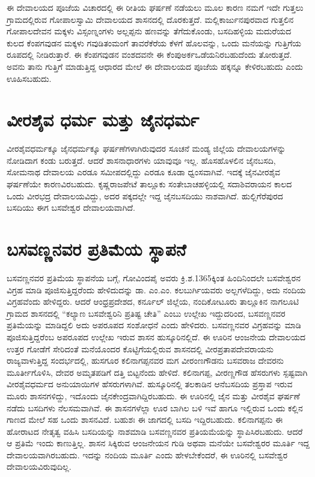 ಈ ದೇವಾಲಯದ ಪೂಜೆಯ ವಿಚಾರದಲ್ಲಿ ಈ ರೀತಿಯ ಘರ್ಷಣೆ ನಡೆಯಲು ಮೂಲ ಕಾರಣ ನಮಗೆ ಇದೇ ಗುತ್ತಲು ಗ್ರಾಮದಲ್ಲಿರುವ ಗೋಪಾಲಸ್ವಾಮಿ ದೇವಾಲಯದ ಶಾಸನದಲ್ಲಿ ದೊರಕುತ್ತದೆ. ಮಲ್ಲಿಕಾರ್ಜುನಪುರವಾದ ಗುತ್ತಲಿನ ಗೋಪಾಲದೇವನ ಮಕ್ಕಳು ವಿಸ್ಸಂಣ್ನಂಗಳು ಅಲ್ಲಪ್ಪನು ಹಣವನ್ನು ತೆಗೆದುಕೊಂಡು, ಬಸದಿಹಳ್ಳಿಯ ಮದುರೆಯದ ಕುಲದ ಕೆಂಪಗವುಡನ ಮಕ್ಕಳು ಗವುಡಿತಂಮಂಗೆ ತಾವರೆಕೆರೆಯ ಕೆಳಗೆ ಹೊಲವನ್ನು, ಒಂದು ಮನೆಯನ್ನು ಗುತ್ತಿಗೆಯ ರೂಪದಲ್ಲಿ ನೀಡಿರುತ್ತಾರೆ. ಈ ಕೆಂಪಗವುಡನ ವಂಶದವನೇ ಈ ಕೆಂಪುಅರ್ಕಒಡೆಯನಿರಬಹುದೆಂದು ತೋರುತ್ತದೆ. ಅವನು ತಾನು ಗುತ್ತಿಗೆ ಮಾಡುತ್ತಿದ್ದ ಆಧಾರದ ಮೇಲೆ ಈ ದೇವಾಲಯದ ಪೂಜೆಯ ಹಕ್ಕನ್ನೂ ಕೇಳಿರಬಹುದು ಎಂದು ಊಹಿಸಬಹುದು.


\section{ವೀರಶೈವ ಧರ್ಮ ಮತ್ತು ಜೈನಧರ್ಮ}

ವೀರಶೈವಧರ್ಮಕ್ಕೂ ಜೈನಧರ್ಮಕ್ಕೂ ಘರ್ಷಣೆಗಳಾಗಿರುವುದರ ಸೂಚನೆ ಮಂಡ್ಯ ಜಿಲ್ಲೆಯ ದೇವಾಲಯಗಳನ್ನು ನೋಡಿದಾಗ ಕಂಡು ಬರುತ್ತದೆ. ಆದರೆ ಶಾಸನಾಧಾರಗಳು ಯಾವುವೂ ಇಲ್ಲ. ಹೊಸಹೊಳಲಿನ ಜೈನಬಸದಿ, ಸೋಮನಾಥ ದೇವಾಲಯ ಎರಡೂ ಸಮೀಪದಲ್ಲಿದ್ದು ಎರಡೂ ಕೂಡಾ ಧ್ವಂಸವಾಗಿವೆ. ಇದಕ್ಕೆ ಜೈನವೀರಶೈವ ಘರ್ಷಣೆಯೇ ಕಾರಣವಿರಬಹುದು. ಕೃಷ್ಣರಾಜಪೇಟೆ ತಾಲ್ಲೂಕು ಸಂತೇಬಾಚಹಳ್ಳಿಯಲ್ಲಿ ಸದಾಶಿವರಾಯನ ಕಾಲದ ಒಂದು ವೀರಭದ್ರ ದೇವಾಲಯವಿದ್ದು, ಅದರ ಪಕ್ಕದಲ್ಲೇ ಇದ್ದ ಜೈನಬಸದಿಯು ನಾಶವಾಗಿದೆ. ಹುಲ್ಲಿಗೆರೆಪುರದ ಬಸದಿಯು ಈಗ ಬಸವೇಶ್ವರ ದೇವಾಲಯವಾಗಿದೆ.


\section{ಬಸವಣ್ಣನವರ ಪ್ರತಿಮೆಯ ಸ್ಥಾಪನೆ}

ಬಸವಣ್ಣನವರ ಪ್ರತಿಮೆಯ ಸ್ಥಾಪನೆಯ ಬಗ್ಗೆ, ಗೋವಿಂದಪೈ ಅವರು ಕ್ರಿ.ಶ.1365ಕ್ಕಿಂತ ಹಿಂದಿನಿಂದಲೇ ಬಸವೇಶ್ವರನ ವಿಗ್ರಹ ಮಾಡಿ ಪೂಜಿಸುತ್ತಿದ್ದರೆಂದು ಹೇಳಿದುದನ್ನು ಡಾ. ಎಂ.ಎಂ. ಕಲಬುರ್ಗಿಯವರು ಅಲ್ಲಗಳೆದಿದ್ದು, ಅದು ನಂದಿಯ ವಿಗ್ರಹವೆಂದು ಹೇಳಿದ್ದರು. ಆದರೆ ಆಂಧ್ರಪ್ರದೇಶದ, ಕರ್ನೂಲ್​ ಜಿಲ್ಲೆಯ, ನಂದಿಕೋಟೂರು ತಾಲ್ಲೂಕಿನ ನಾಗಲೂಟಿ ಗ್ರಾಮದ ಶಾಸನದಲ್ಲಿ “ಕಲ್ಯಾಣ ಬಸವೇಶ್ವರಿನಿ ಪ್ರತಿಷ್ಟ ಚೇತಿ” ಎಂಬು ಉಲ್ಲೇಖ ಇದ್ದುದರಿಂದ, ಬಸವಣ್ಣನವರ ಪ್ರತಿಮೆಯನ್ನು ಮಾಡಿದ್ದಲಿ ಅದು ಅಪರೂಪದ ಸಂಶೋಧನೆ ಎಂದು ಹೇಳಿದರು. ಬಸವಣ್ಣನವರ ವಿಗ್ರಹವನ್ನು ಮಾಡಿ ಪೂಜಿಸುತ್ತಿದ್ದರೆಂಬ ಅಪರೂಪದ ಉಲ್ಲೇಖ ಇರುವ ಶಾಸನ ಹುಸ್ಕೂರಿನಲ್ಲಿದೆ. ಈ ಊರಿನ ಆಂಜನೇಯ ದೇವಾಲಯದ ಉತ್ತರ ಗೋಡೆಗೆ ಸೇರಿದಂತೆ ಮನೆಯೊಂದರ ಕೊಟ್ಟಿಗೆಯಲ್ಲಿರುವ ಶಾಸನದಲ್ಲಿ ವೀರಪ್ರತಾಪದೇವರಾಯನು ರಾಜ್ಯವಾಳುತ್ತಿದ್ದ ಸಂದರ್ಭದಲ್ಲಿ, ಹುಸಗೂರ ಕಲಿನಾಗಪ್ಪನವರ ಮಗ ವೀರಂಣಗೌಡನು ಬಸವರಾಜ ದೇವರನು ಮೂರ್ತೀಗೊಳಿಸಿ, ದೇವರ ಅಮೃತಪಡಿಗೆ ದತ್ತಿ ಬಿಟ್ಟನೆಂದು ಹೇಳಿದೆ. ಕಲಿನಾಗಪ್ಪ, ವೀರಣ್ಣಗೌಡ ಹೆಸರುಗಳು ಸ್ಪಷ್ಟವಾಗಿ ವೀರಶೈವಧರ್ಮದ ಅನುಯಾಯಿಗಳ ಹೆಸರುಗಳಾಗಿವೆ. ಹುಸ್ಕೂರಿನಲ್ಲಿ ತಲಕಾಡಿನ ಆನೆಬಸದಿಯ ಪ್ರಸ್ತಾಪ ಇರುವ ಮೂರು ಶಾಸನಗಳಿದ್ದು, ಇದೊಂದು ಜೈನಕೇಂದ್ರವಾಗಿದ್ದಿರಬಹುದು. ಈ ಊರಿನಲ್ಲಿ ಜೈನ ಮತ್ತು ವೀರಶೈವ ಘರ್ಷಣೆ ನಡೆದು ಬಸದಿಗಳು ನೆಲಸಮವಾಗಿವೆ. ಈ ಶಾಸನಗಳೆಲ್ಲಾ ಊರ ಬಾಗಿಲ ಬಳಿ ಇವೆ ಹಾಗೂ ಇಲ್ಲಿರುವ ಒಂದು ಕಲ್ಲಿನ ಗಾಣದ ಮೇಲೆ ಸಹ ಒಂದು ಶಾಸನವಿದೆ. ಬಹುಶಃ ಈ ಜಾಗದಲ್ಲಿ ಬಸದಿ ಇದ್ದಿರಬಹುದು. ಕಲಿನಾಗಪ್ಪನು ಈ ಹೋರಾಟದ ನೇತೃತ್ವ ವಹಿಸಿ ಬಸದಿಯನ್ನು ನಾಶಮಾಡಿ ಬಸವಣ್ಣನವರ ಪ್ರತಿಯಮೆಯನ್ನು ಸ್ಥಾಪಿಸಿರಬಹುದು. ಆದರೆ ಆ ಪ್ರತಿಮೆ ಇಂದು ಕಾಣುತ್ತಿಲ್ಲ. ಶಾಸನ ಸಿಕ್ಕಿರುವ ಆಂಜನೇಯನ ಗುಡಿ ಅಥವಾ ಮನೆಯೇ ಬಸವೇಶ್ವರರ ಮೂರ್ತಿ ಇದ್ದ ದೇವಾಲಯವಾಗಿರಬಹುದು. ಇದನ್ನು ನಂದಿಯ ಮೂರ್ತಿ ಎಂದು ಹೇಳಬೇಕೆಂದರೆ, ಈ ಊರಿನಲ್ಲಿ ಬಸವೇಶ್ವರ ದೇವಾಲಯವಿರುವುದಿಲ್ಲ.

